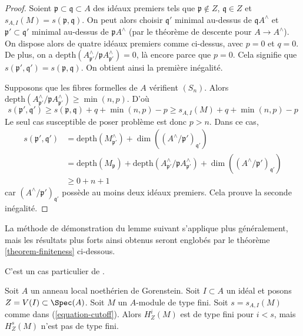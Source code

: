 \begin{proof}
\medskip\noindent
Soient $\mathfrak p \subset \mathfrak q \subset A$ des idéaux premiers tels que $\mathfrak p \not \in Z$, $\mathfrak q \in Z$ et $s_{A, I}(M) = s(\mathfrak p, \mathfrak q)$. On peut alors choisir $\mathfrak q'$ minimal au-dessus de $\mathfrak q A^\wedge$ et $\mathfrak p' \subset \mathfrak q'$ minimal au-dessus de $\mathfrak p A^\wedge$ (par le théorème de descente pour $A \to A^\wedge$). On dispose alors de quatre idéaux premiers comme ci-dessus, avec $p = 0$ et $q = 0$. De plus, on a $\text{depth}(A^\wedge_{\mathfrak p'} / \mathfrak p A^\wedge_{\mathfrak p'})=0$, là encore parce que $p = 0$. Cela signifie que $s(\mathfrak p', \mathfrak q') = s(\mathfrak p, \mathfrak q)$. On obtient ainsi la première inégalité.

\medskip\noindent
Supposons que les fibres formelles de $A$ vérifient $(S_n)$. Alors $\text{depth}(A^\wedge_{\mathfrak p'} / \mathfrak p A^\wedge_{\mathfrak p'})
\geq \min(n, p)$. D'où
$$
s(\mathfrak p', \mathfrak q') \geq
s(\mathfrak p, \mathfrak q) + q + \min(n, p) - p \geq
s_{A, I}(M) + q + \min(n, p) - p
$$
Le seul cas susceptible de poser problème est donc $p > n$. Dans ce cas,
\begin{align*}
s(\mathfrak p', \mathfrak q')
& =
\text{depth}(M^\wedge_{\mathfrak p'}) +
\dim((A^\wedge/\mathfrak p')_{\mathfrak q'}) \\
& =
\text{depth}(M_\mathfrak p) +
\text{depth}(A^\wedge_{\mathfrak p'} / \mathfrak p A^\wedge_{\mathfrak p'}) +
\dim((A^\wedge/\mathfrak p')_{\mathfrak q'}) \\
& \geq
0 + n + 1
\end{align*}
car $(A^\wedge/\mathfrak p')_{\mathfrak q'}$ possède au moins deux idéaux premiers. Cela prouve la seconde inégalité.
\end{proof}

\noindent
La méthode de démonstration du lemme suivant s'applique plus généralement, mais les résultats plus forts ainsi obtenus seront englobés par le théorème \ref{theorem-finiteness} ci-dessous.

\begin{lemma}
\label{lemma-local-annihilator}
\begin{reference}
C'est un cas particulier de \cite[Satz 1]{Faltings-annulators}.
\end{reference}
Soit $A$ un anneau local noethérien de Gorenstein. Soit $I \subset A$ un idéal et posons $Z = V(I) \subset \Spec(A)$. Soit $M$ un $A$-module de type fini. Soit $s = s_{A, I}(M)$ comme dans (\ref{equation-cutoff}). Alors $H^i_Z(M)$ est de type fini pour $i < s$, mais $H^s_Z(M)$ n'est pas de type fini.
\end{lemma}

